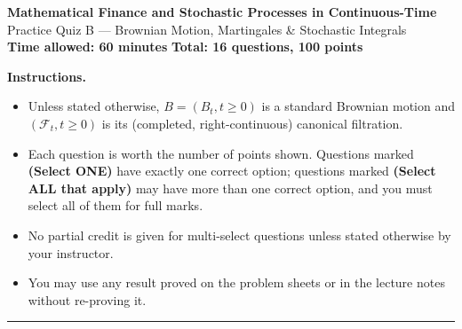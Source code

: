 \documentclass[11pt]{article}
\begin{document}
\begin{center}
{\LARGE\bfseries Mathematical Finance and Stochastic Processes in Continuous-Time}\\[4pt]
{\Large Practice Quiz B --- Brownian Motion, Martingales \& Stochastic Integrals}\\[8pt]
\textbf{Time allowed: 60 minutes} \qquad \textbf{Total: 16 questions, 100 points}
\end{center}

\vspace{4pt}
\noindent\textbf{Instructions.}
\begin{itemize}[nosep,leftmargin=*]
  \item Unless stated otherwise, $B=(B_t,t\ge0)$ is a standard Brownian motion and $(\mathcal F_t,t\ge0)$ is its (completed, right-continuous) canonical filtration.
  \item Each question is worth the number of points shown. Questions marked \textbf{(Select ONE)} have exactly one correct option; questions marked \textbf{(Select ALL that apply)} may have more than one correct option, and you must select all of them for full marks.
  \item No partial credit is given for multi-select questions unless stated otherwise by your instructor.
  \item You may use any result proved on the problem sheets or in the lecture notes without re-proving it.
\end{itemize}

\vspace{10pt}
\hrule
\vspace{10pt}
\end{document}
